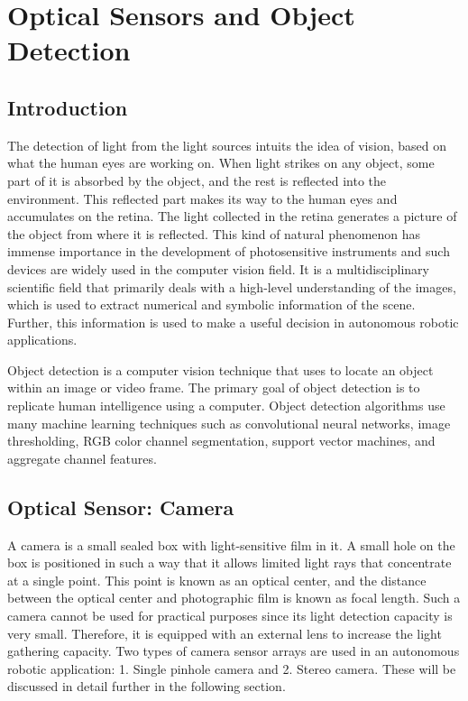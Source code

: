 \chapter{Optical Sensors and Object Detection}
\label{ch:Optical Sensors and Object Detection}

\section{Introduction}
The detection of light from the light sources intuits the idea of vision, based on what the human eyes are working on. When light strikes on any object, some part of it is absorbed by the object, and the rest is reflected into the environment. This reflected part makes its way to the human eyes and accumulates on the retina. The light collected in the retina generates a picture of the object from where it is reflected. This kind of natural phenomenon has immense importance in the development of photosensitive instruments \cite{opencv} and such devices are widely used in the computer vision field. It is a multidisciplinary scientific field that primarily deals with a high-level understanding of the images, which is used to extract numerical and symbolic information of the scene. Further, this information is used to make a useful decision in autonomous robotic applications.

Object detection is a computer vision technique that uses to locate an object within an image or video frame. The primary goal of object detection is to replicate human intelligence using a computer. Object detection algorithms use many machine learning techniques such as convolutional neural networks, image thresholding, RGB color channel segmentation, support vector machines, and aggregate channel features.
    
\section{Optical Sensor: Camera}
A camera is a small sealed box with light-sensitive film in it. A small hole on the box is positioned in such a way that it allows limited light rays that concentrate at a single point. This point is known as an optical center, and the distance between the optical center and photographic film is known as focal length. Such a camera cannot be used for practical purposes since its light detection capacity is very small. Therefore, it is equipped with an external lens to increase the light gathering capacity. Two types of camera sensor arrays are used in an autonomous robotic application: 1. Single pinhole camera and 2. Stereo camera. These will be discussed in detail further in the following section.

